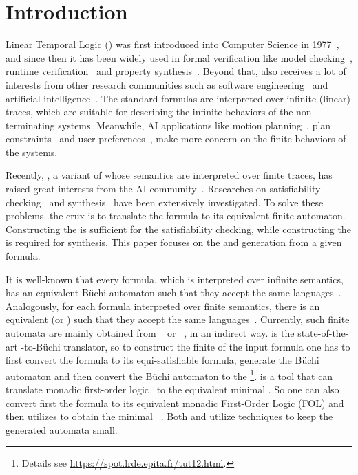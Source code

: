 \section{Introduction}

Linear Temporal Logic (\ltl) was first introduced into Computer Science in 1977~\cite{Pnu77}, and since then it has been widely used in formal verification like model checking~\cite{CGD99}, runtime verification~\cite{BLS11} and property synthesis~\cite{JGWB07,BFJ12}. Beyond that, \ltl also receives a lot of interests from other research communities such as software engineering~\cite{BKMR15} and artificial intelligence~\cite{BK98}. The standard \ltl formulas are interpreted over infinite (linear) traces, which are suitable for describing the infinite behaviors of the non-terminating systems. Meanwhile, AI applications like motion planning~\cite{BK98,DV99,CDV02,PLGG11,CBMM17}, plan constraints~\cite{BK00,Gab04} and user preferences~\cite{BFM06,BFM11,SBM11}, make more concern on the finite behaviors of the systems. 

Recently, \ltlf, a variant of \ltl whose semantics are interpreted over finite traces, has raised great interests from the AI community~\cite{GV13,GV15,DDM14}. Researches on \ltlf satisfiability checking~\cite{LZPVH14,LRPZV19,FG16} and \ltlf synthesis~\cite{GV15,ZTLPV17,CMBM18} have been extensively investigated. To solve these problems, the crux is to translate the \ltlf formula to its equivalent finite automaton. Constructing the \NFA is sufficient for the satisfiability checking, while constructing the \DFA is required for \ltlf synthesis. This paper focuses on the \NFA and \DFA generation from a given \ltlf formula. 

It is well-known that every \ltl formula, which is interpreted over infinite semantics, has an equivalent B\"uchi automaton such that they accept the same languages~\cite{GPVW95}. Analogously, for each \ltlf formula interpreted over finite semantics, there is an equivalent \NFA (or \DFA) such that they accept the same languages~\cite{GV15}. Currently, such finite automata are mainly obtained from \spot~\cite{DP04} or \mona~\cite{HJJKPRS95,EKM98}, in an indirect way. \spot is the state-of-the-art \ltl-to-B\"uchi translator, so to construct the finite \NFA of the input \ltlf formula one has to first convert the \ltlf formula to its equi-satisfiable \ltl formula, generate the B\"uchi automaton and then convert the B\"uchi automaton to the \NFA\footnote{Details see \url{https://spot.lrde.epita.fr/tut12.html}.}. \mona is a tool that can translate monadic first-order logic~\cite{Tra62} to the equivalent minimal \DFA. So one can also convert first the \ltlf formula to its equivalent monadic First-Order Logic (FOL) and then utilizes \mona to obtain the minimal \DFA~\cite{ZTLPV17}. Both \spot and \mona utilize \BDD techniques to keep the generated automata small. 


